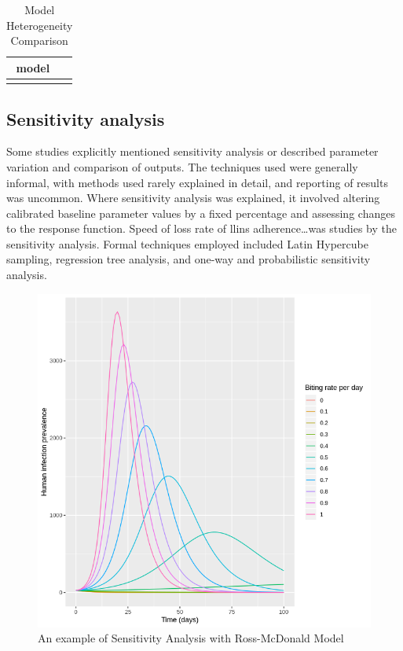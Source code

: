 \documentclass[a4paper, 12pt, twoside]{article}
\begin{document}
\begin{table}[htpb]
	\centering
	\caption{Model Heterogeneity Comparison}
	\label{tab:model_heterogeneity_comparison}
	\begin{tabular}{cc}
		\toprule
		model             & \\
		\midrule
		\cite{White2018b} & \\
		\bottomrule
	\end{tabular}
\end{table}

\subsection{Sensitivity analysis}%
\label{par:sensitivity_analysis}
Some studies\cite{Mohammed-Awel2019, White2018b} explicitly mentioned sensitivity analysis or described parameter variation and comparison of outputs.
The techniques used were generally informal, with methods used rarely explained in detail, and reporting of results was uncommon.
Where sensitivity analysis was explained, it involved altering calibrated baseline parameter values by a fixed percentage and assessing changes to the response function.
Speed of loss rate of \gls{llins} adherence\cite{White2018b}\ldots was studies by the sensitivity analysis.
Formal techniques employed included Latin Hypercube sampling, regression tree analysis, and one-way and probabilistic sensitivity analysis.

\begin{figure}[htpb]
	\centering
	\includegraphics[width=\textwidth]{ross-mcdonald-sensitivity}
	\caption{An example of Sensitivity Analysis with Ross-McDonald Model}
	\label{fig:ross-mcdonald-sensitivity}
\end{figure}
\end{document}
